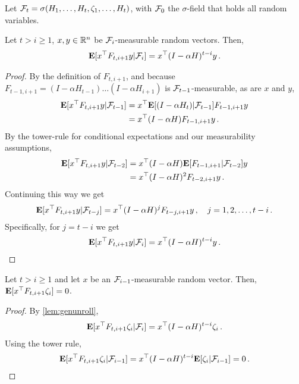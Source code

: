 Let $\mathcal{F}_t = \sigma( H_1,\dots,H_t, \zeta_1,\dots,H_t ) $, with $\mathcal{F}_0$ the $\sigma$-field that holds all random variables.
\newcommand{\cF}{\F}
\begin{lemma}\label{lem:genunroll}
Let $t>i\ge 1$, $x,y\in \mathbb{R}^n$ be $\mathcal{F}_{i}$-measurable random vectors. Then,
\begin{align*}
\mathbf{E}[x^\top F_{t,i+1}y|\mathcal{F}_i]=x^\top (I-\alpha H)^{t-i} y\,.
\end{align*}
\end{lemma}
\begin{proof}
By the definition of $F_{t,i+1}$,
and because $F_{t-1,i+1} = (I-\alpha H_{t-1}) \dots (I-\alpha H_{i+1})$ is $\cF_{t-1}$-measurable,
as are $x$ and $y$,
\begin{align*}
\EE{x^\top F_{t,i+1} y | \cF_{t-1} } &= x^\top \EE{ (I-\alpha H_t) | \cF_{t-1} } F_{t-1,i+1} y\\
&=x^\top  (I-\alpha H)  F_{t-1,i+1} y\,.
\end{align*}
By the tower-rule for conditional expectations and our measurability assumptions,
\begin{align*}
\EE{x^\top F_{t,i+1} y | \cF_{t-2} }
&=x^\top  (I-\alpha H)  \EE{F_{t-1,i+1} |\cF_{t-2}} y\\
&= x^\top (I-\alpha H)^2 F_{t-2,i+1} y\,.
\end{align*}
Continuing this way we get
\begin{align*}
\EE{x^\top F_{t,i+1} y | \cF_{t-j} }
= x^\top (I-\alpha H)^j F_{t-j,i+1} y\,, \quad j=1,2,\dots,t-i\,.
\end{align*}
Specifically, for $j=t-i$ we get
\begin{align*}
\EE{x^\top F_{t,i+1} y | \cF_{i} }  = x^\top (I-\alpha H)^{t-i} y\,.
\end{align*}
\end{proof}

\begin{lemma}\label{noisecancel}
Let $t>i\ge 1$ and let $x$ be an $\mathcal{F}_{i-1}$-measurable random vector. Then,
$\mathbf{E}[x^\top F_{t,i+1}\zeta_{i}]=0$.
\end{lemma}
\begin{proof}
By \cref{lem:genunroll},
\begin{align*}
\EE{x^\top F_{t,i+1} \zeta_i | \cF_{i} }  = x^\top (I-\alpha H)^{t-i} \zeta_i\,.
\end{align*}
Using the tower rule,
\begin{align*}
\EE{x^\top F_{t,i+1} \zeta_i | \cF_{i-1} }
= x^\top (I-\alpha H)^{t-i}\EE{ \zeta_i | \cF_{i-1} }= 0\,.
\end{align*}
\end{proof}

